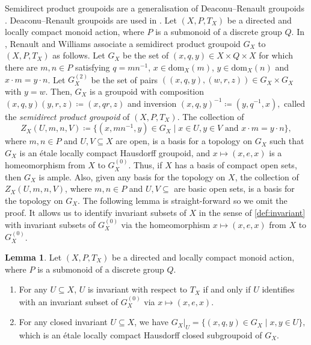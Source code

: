 \documentclass[11pt]{amsart}
\theoremstyle{definition}
\numberwithin{thm}{section}
\numberwithin{equation}{section}
\newtheorem{lemma}[thm]{Lemma}
\newcommand{\Define}[1]{\emph{#1}}
\newcommand{\setof}[2]{\{ #1 \mid #2 \}}
\newcommand{\RPA}[2]{#1 \cdot #2}
\newcommand{\RPAdom}[2]{\textrm{dom}_{#1}(#2)}
\newcommand{\SDPG}[1]{G_{#1}}
\newcommand{\SDPGcylinder}[5]{Z_{#1}(#2,#3,#4,#5)}
\newcommand{\reduction}[2]{#1|_{#2}}
\newcommand{\composablepairs}[1]{#1^{(2)}}
\newcommand{\unitspace}[1]{#1^{(0)}}
\begin{document}
Semidirect product groupoids are a generalisation of Deaconu--Renault groupoids \cite{Dea95, Ren00}. 
Deaconu--Renault groupoids are used in \cite[\S 2.2]{ABCE23}.
Let $(X, P, T_X)$ be a directed and locally compact monoid action, where $P$ is a submonoid of a discrete group $Q$.
In \cite{RW17}, Renault and Williams associate a semidirect product groupoid $\SDPG{X}$ to $(X, P, T_X)$ as follows.
Let $\SDPG{X}$ be the set of $(x,q,y) \in X \times Q \times X$ for which there are $m,n \in P$ satisfying $q = mn^{-1}$, $x \in \RPAdom{X}{m}$, $y \in \RPAdom{X}{n}$ and $\RPA{x}{m} = \RPA{y}{n}$. 
Let $\composablepairs{\SDPG{X}}$ be the set of pairs $((x,q,y),(w,r,z)) \in \SDPG{X} \times \SDPG{X}$ with $y = w$. 
Then, $\SDPG{X}$ is a groupoid with composition 
\(
(x,q,y)(y,r,z) \coloneqq (x,qr,z)
\)
and inversion 
\(
(x,q,y)^{-1} \coloneqq (y,q^{-1},x),
\)
called the \Define{semidirect product groupoid} of $(X, P, T_X)$.
The collection of 
\[
\SDPGcylinder{X}{U}{m}{n}{V} \coloneqq 
\setof{
(x,mn^{-1},y) \in \SDPG{X}
}{
x \in U, y \in V \text{ and } \RPA{x}{m} = \RPA{y}{n}
},
\]
where $m, n \in P$ and $U, V \subseteq X$ are open, is a basis for a topology on $\SDPG{X}$ such that $\SDPG{X}$ is an \'etale locally compact Hausdorff groupoid, and $x \mapsto (x, e, x)$ is a homeomorphism from $X$ to $\unitspace{\SDPG{X}}$.
Thus, if $X$ has a basis of compact open sets, then $\SDPG{X}$ is ample.
Also, given any basis for the topology on $X$, the collection of $\SDPGcylinder{X}{U}{m}{n}{V}$, where $m, n \in P$ and $U, V \subseteq $ are basic open sets, is a basis for the topology on $\SDPG{X}$.
The following lemma is straight-forward so we omit the proof.
It allows us to identify invariant subsets of $X$ in the sense of \cref{def:invariant} with invariant subsets of $\unitspace{\SDPG{X}}$ via the homeomorphism $x \mapsto (x, e, x)$ from $X$ to $\unitspace{\SDPG{X}}$.

\begin{lemma}
\label{lem:inv}
Let $(X, P, T_X)$ be a directed and locally compact monoid action, where $P$ is a submonoid of a discrete group $Q$.
\begin{enumerate}
\item \label{it1:leminv} For any $U \subseteq X$, $U$ is invariant with respect to $T_X$ if and only if $U$ identifies with an invariant subset of $\unitspace{\SDPG{X}}$ via $x \mapsto (x, e, x)$.
\item \label{item2:inv} For any closed invariant $U \subseteq X$, we have
\(
\reduction{\SDPG{X}}{U} = \setof{(x, q, y) \in \SDPG{X}}{x, y \in 
U},
\)
which is an \'etale locally compact Hausdorff closed subgroupoid of $\SDPG{X}$.
\end{enumerate}
\end{lemma}
\end{document}
